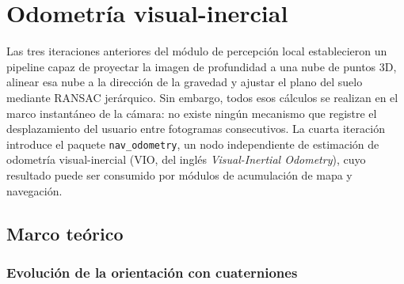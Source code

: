 %

\section{Odometría visual-inercial}
\label{sec:lm-vio}

Las tres iteraciones anteriores del módulo de percepción local establecieron
un pipeline capaz de proyectar la imagen de profundidad a una nube de puntos
3D, alinear esa nube a la dirección de la gravedad y ajustar el plano del
suelo mediante RANSAC jerárquico. Sin embargo, todos esos cálculos se realizan
en el marco instantáneo de la cámara: no existe ningún mecanismo que registre
el desplazamiento del usuario entre fotogramas consecutivos. La cuarta
iteración introduce el paquete \texttt{nav\_odometry}, un nodo independiente
de estimación de odometría visual-inercial (VIO, del inglés
\emph{Visual-Inertial Odometry}), cuyo resultado puede ser consumido por
módulos de acumulación de mapa y navegación.

\subsection{Marco teórico}
\subsubsection{Evolución de la orientación con cuaterniones}

